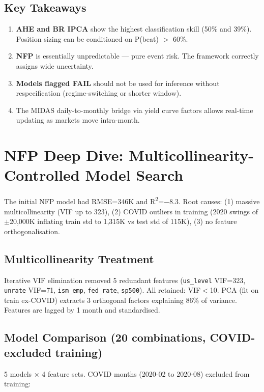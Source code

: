 \documentclass[11pt,a4paper]{article}
\begin{document}
\subsection*{Key Takeaways}
\begin{enumerate}[nosep, leftmargin=1.4em]
    \item \textbf{AHE and BR IPCA} show the highest classification skill (50\% and 39\%). Position sizing can be conditioned on P(beat) $>$ 60\%.
    \item \textbf{NFP} is essentially unpredictable --- pure event risk. The framework correctly assigns wide uncertainty.
    \item \textbf{Models flagged FAIL} should not be used for inference without respecification (regime-switching or shorter window).
    \item The MIDAS daily-to-monthly bridge via yield curve factors allows real-time updating as markets move intra-month.
\end{enumerate}

\newpage

\section*{NFP Deep Dive: Multicollinearity-Controlled Model Search}

The initial NFP model had RMSE=346K and R\textsuperscript{2}=$-$8.3. Root causes: (1) massive multicollinearity (VIF up to 323), (2) COVID outliers in training (2020 swings of $\pm$20,000K inflating train std to 1,315K vs test std of 115K), (3) no feature orthogonalisation.

\subsection*{Multicollinearity Treatment}
Iterative VIF elimination removed 5 redundant features (\texttt{us\_level} VIF=323, \texttt{unrate} VIF=71, \texttt{ism\_emp}, \texttt{fed\_rate}, \texttt{sp500}). All retained: VIF$<$10. PCA (fit on train ex-COVID) extracts 3 orthogonal factors explaining 86\% of variance. Features are lagged by 1 month and standardised.

\subsection*{Model Comparison (20 combinations, COVID-excluded training)}
5 models $\times$ 4 feature sets. COVID months (2020-02 to 2020-08) excluded from training:
\end{document}
